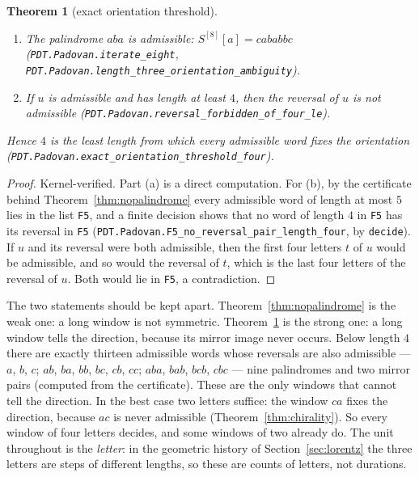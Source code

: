 \documentclass[11pt]{amsart}
\theoremstyle{plain}
\newtheorem{theorem}{Theorem}[section]
\theoremstyle{definition}
\theoremstyle{remark}
\begin{document}
\begin{theorem}[exact orientation threshold]\label{thm:threshold}
\leavevmode
\begin{enumerate}
\item[(a)] The palindrome $aba$ is admissible: $S^{[8]}[a] = cababbc$
\textup{(\texttt{PDT.Padovan.iterate\_eight},
\texttt{PDT.Padovan.length\_three\_orientation\_ambiguity})}.
\item[(b)] If $u$ is admissible and has length at least $4$, then the reversal of $u$ is not
admissible \textup{(\texttt{PDT.Padovan.reversal\_forbidden\_of\_four\_le})}.
\end{enumerate}
Hence $4$ is the least length from which every admissible word fixes the orientation
\textup{(\texttt{PDT.Padovan.exact\_orientation\_threshold\_four})}.
\end{theorem}

\begin{proof}
Kernel-verified. Part (a) is a direct computation. For (b), by the certificate behind
Theorem~\ref{thm:nopalindrome} every admissible word of length at most $5$ lies in the list
\texttt{F5}, and a finite decision shows that no word of length $4$ in \texttt{F5} has its
reversal in \texttt{F5} \textup{(\texttt{PDT.Padovan.F5\_no\_reversal\_pair\_length\_four},
by \texttt{decide})}. If $u$ and its reversal were both admissible, then the first four
letters $t$ of $u$ would be admissible, and so would the reversal of $t$, which is the last
four letters of the reversal of $u$. Both would lie in \texttt{F5}, a contradiction.
\end{proof}

The two statements should be kept apart. Theorem~\ref{thm:nopalindrome} is the weak one: a
long window is not symmetric. Theorem~\ref{thm:threshold} is the strong one: a long window
tells the direction, because its mirror image never occurs. Below length $4$ there are
exactly thirteen admissible words whose reversals are also admissible --- $a$, $b$, $c$;
$ab$, $ba$, $bb$, $bc$, $cb$, $cc$; $aba$, $bab$, $bcb$, $cbc$ --- nine palindromes and two
mirror pairs (computed from the certificate). These are the only windows that cannot tell
the direction. In the best case two letters suffice: the window $ca$ fixes the direction,
because $ac$ is never admissible (Theorem~\ref{thm:chirality}). So every window of four
letters decides, and some windows of two already do. The unit throughout is the
\emph{letter}: in the geometric history of Section~\ref{sec:lorentz} the three letters are
steps of different lengths, so these are counts of letters, not durations.
\end{document}
